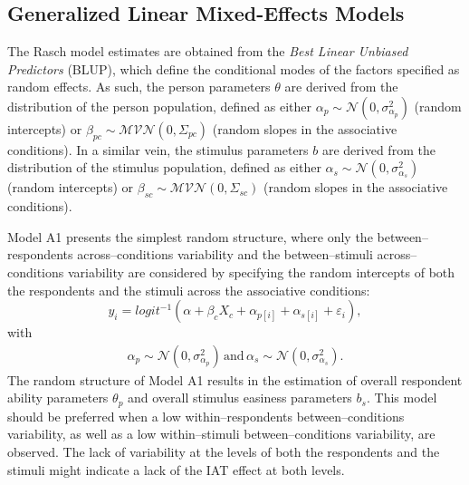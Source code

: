 \documentclass[12pt]{book}
\begin{document}
\subsection[Generalized Linear Mixed-Effects Models]{Generalized Linear Mixed-Effects Models}\label{sec:accuracymodels}
The Rasch model estimates are obtained from the \emph{Best Linear Unbiased Predictors} (BLUP), which define the conditional modes of the factors specified as random effects. 
	As such, the person parameters $\theta$ are derived from the distribution of the person population, defined as either $\alpha_p \sim \mathcal{N}(0, \sigma_{\alpha_p}^2)$ (random intercepts) or $\beta_{pc} \sim \mathcal{MVN}(0, \Sigma_{pc})$ (random slopes in the associative conditions). 
	In a similar vein, the stimulus parameters $b$ are derived from the  distribution of the stimulus population, defined as either $\alpha_s \sim \mathcal{N}(0, \sigma_{\alpha_s}^2)$ (random intercepts) or $\beta_{sc} \sim \mathcal{MVN}(0, \Sigma_{sc})$ (random slopes in the associative conditions). 

Model A1 presents the simplest random structure, where only the between--respondents across--conditions variability and the between--stimuli across--conditions variability are considered by specifying the random intercepts of both the respondents and the stimuli across the associative conditions: 
\begin{equation}\label{AccuracyMin}
	y_{i} = logit^{-1}(\alpha + \beta_cX_c + \alpha_{p[i]} +  \alpha_{s[i]} + \varepsilon_{i}),
\end{equation}
with
\begin{align}
	\alpha_{p} \sim  \mathcal{N} ( 0, \sigma_{\alpha_p}^2) \, \text{and} \, \alpha_{s}  \sim  \mathcal{N} (0,\sigma_{\alpha_s}^2).
\end{align}
The random structure of Model A1 results in the estimation of overall respondent ability parameters $\theta_{p}$ and overall stimulus easiness parameters $b_s$. 
This model should be preferred when a low within--respondents between--conditions variability, as well as a low within--stimuli between--conditions variability, are observed. The lack of variability at the levels of both the respondents and the stimuli might indicate a lack of the IAT effect at both levels. 
\end{document}
